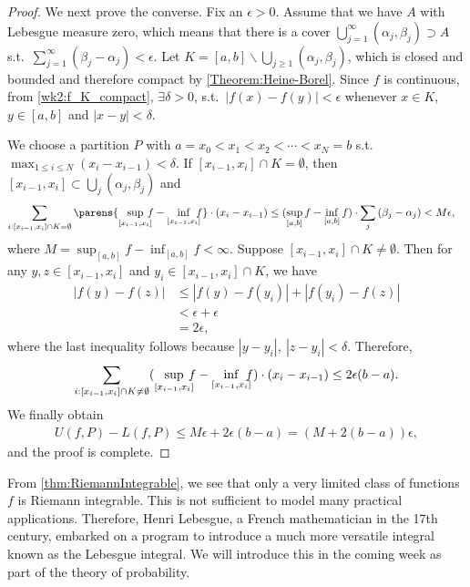 \documentclass[12pt]{article}
\begin{document}
\begin{proof}
We next prove the converse. Fix an $\epsilon>0$. Assume that we have $A$ with Lebesgue measure zero, which means that there is a cover $\bigcup_{j=1}^{\infty}{(\alpha_j,\beta_j)} \supset A$ s.t.\ $\sum_{j=1}^{\infty}(\beta_j-\alpha_j)<\epsilon$.  Let $K=[a,b]\backslash\bigcup_{j\geq 1}{(\alpha_j,\beta_j)}$, which is closed and bounded and therefore compact by \cref{Theorem:Heine-Borel}. Since $f$ is continuous, from \cref{wk2:f_K_compact}, $\exists \delta>0$, s.t.\ $|f(x)-f(y)|<\epsilon$ whenever $x \in K$, $y\in[a,b]$ and $|x-y|<\delta$. 

We choose a partition $P$ with $a=x_0<x_1<x_2<\cdots<x_N=b$ s.t.\ $\max_{1\leq i \leq N}(x_i-x_{i-1})<\delta$. If $[x_{i-1},x_i]\cap K=\emptyset$, then $[x_{i-1},x_i]\subset \bigcup_{j}{(\alpha_j,\beta_j)}$ and
\begin{align*}
\sum_{i:[x_{i-1},x_i]\cap K=\emptyset}{\parens{\sup_{[x_{i-1},x_i]}\mathllap{f}-\inf_{[x_{i-1},x_i]}\mathllap{f}}\cdot(x_i-x_{i-1})}&\leq (\sup_{[a,b]}{f}-\inf_{[a,b]}{f})\cdot \sum_{j}{(\beta_j-\alpha_j)} < M\epsilon,
\end{align*}
where $M=\sup_{[a,b]}{f}-\inf_{[a,b]}{f} < \infty$. Suppose $[x_{i-1},x_i]\cap K\ne\emptyset$. Then for any $y, z \in [x_{i-1},x_i]$ and $y_i\in [x_{i-1},x_i]\cap K$, we have 
\begin{align*}
|f(y)-f(z)|&\leq|f(y)-f(y_i)|+|f(y_i)-f(z)|\\
&<\epsilon+\epsilon\\
&=2\epsilon,
\end{align*}
where the last inequality follows because $|y-y_i|,\ |z-y_i| < \delta$. Therefore,
\begin{align*}
\sum_{i: [x_{i-1},x_i]\cap K\ne\emptyset} (\sup_{[x_{i-1},x_i]}\mathllap{f}-\inf_{[x_{i-1},x_i]}\mathllap{f})\cdot(x_i-x_{i-1}) \leq 2\epsilon (b-a).
\end{align*}
We finally obtain
\begin{align*}
U(f,P)-L(f,P)\leq M\epsilon + 2\epsilon(b-a)= (M+2(b-a))\epsilon, 
\end{align*}
and the proof is complete.
\end{proof}

From \cref{thm:RiemannIntegrable}, we see that only a very limited class of functions $f$ is Riemann integrable. This is not sufficient to model many practical applications. Therefore, Henri Lebesgue, a French mathematician in the 17th century, embarked on a program to introduce a much more versatile integral known as the Lebesgue integral. We will introduce this in the coming week as part of the theory of probability. 

%
%
\end{document}
